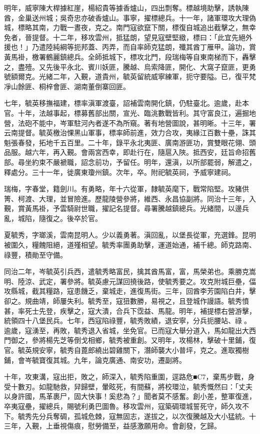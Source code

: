 \begin{pinyinscope}
明年，威寧陳大桿據紅崖，楊紹貴等據香爐山，四出剽奪。標越境助擊，誘執陳酋，金巢送州城；吳奇忠亦破香爐山。事寧，擢標總兵。十一年，諸軍環攻大理偽城，標略其南，力戰一晝夜，克之。南門寇欲竄下關，標復自城追出截擊之，無幸免者，晉提督。十二年，移攻雲州，抵猛朗，望見寇壁堅緻，標曰：「此宜先絕外援也！」乃遣陸純綱等扼邦蓋、丙弄，而自率師克猛朗，殲其酋丁雁甲。論功，賞黃馬褂，檄署鶴麗鎮總兵。全師抵城下，標攻北門，段瑞梅等自東南梯而下，轟擊之，盡殪。又先後平永北、賓川妖匪，騰越、烏索降匪，開化、大窩子竄匪，更勇號額爾克。光緒二年，入覲，道貴州，毓英留統威寧練軍，扼守要隘。已，復平梵凈山餘匪、桐梓會匪、湖南董倒寨回匪。

七年，毓英移撫福建，標率滇軍渡臺，詔補雲南開化鎮，仍駐臺北。逾歲，赴本官。十年，法越事起，標募舊部出關，宣光、臨洮數戰皆利。其守富良江，遍掘地營，法砲不能中，岑軍駐河內者遂不為所窺。著有地營圖說，甚明晰。十三年，署云南提督。毓英檄治惈黑山軍事，標率師前進，效力合攻，夷緣江百數十壘，誅其魁張春發，拓地千五百里。二十年，錄平永北夷匪、廣南游匪功，賞雙眼花翎、頭品服。越六年，再入覲。會兩宮西幸，即赴行在，隨扈入陜。抵西安，廷旨命招舊部。尋坐約束不嚴褫職，詔念前功，予留任。明年，還滇，以所部罷弱，解遣之，釋處分。三十一年，徙廣東瓊州鎮。次年，卒。附祀毓英祠，予威寧建祠。

瑞梅，字春堂，籍劍川。有勇略，年十六從軍，隸毓英麾下，戰常陷堅。攻豬供箐、柯渡、大理，並冒險進。歷龍陵營參將，維西、永昌協副將。同治十三年，入覲，賞黃馬褂，予雲騎尉世職，擢記名提督。尋署騰越鎮總兵。光緒間，以邊兵亂，城陷，隨復之。後卒於官。

夏毓秀，字瑯溪，雲南昆明人。少以義勇著。滇回亂，以堡長從軍，充選鋒。昆明被圍久，糧餽阻絕，道殣相望。毓秀率團勇助擊，運道始通，補千總。師克路南、祿豐，積勛至守備。

同治二年，岑毓英引兵西，遣毓秀略富民，擒其酋馬富，富，馬榮弟也。乘勝克嵩明、陸涼、武定，署參將。毓英慮元謀回撓後路，使毓秀要之。攻克附城巨壘，偪攻縣城，截其糧路，寇患饑乏，棄城走，進復馬街。三年，回酋李芳園陷白井，擊卻之。規曲靖，師屢失利。毓秀至，寇狃數勝，易視之，且登城作謾語。毓秀憤甚，率死士先登，疾擊之，寇大潰，合兵下霑益、馬龍。明年，補提標右營游擊，統領四十八堡民兵。七年，西寇陷祿豐，毓秀敗績，退安寧，分兵扼腰站、祿。逾歲，寇湧至，再敗，毓秀退入省城，坐免官。已而寇大舉分道入，馬如龍出大西門御之，參將楊先芝等倒戈相鄉，毓秀被重創。又明年，攻楊林，擊破十里鋪，復官。毓英規安寧，毓秀自蓖郎繞出碧雞關下，潛師襲大小普坪，克之。進取獨樹鋪，會岑毓寶復其城。九年，論克廣通、南安功，遷副將。

十年，攻東溝，寇出拒，敗之，師深入，毓秀陷重圍，逕路危■C7，棄馬步戰，身受十數刃。如龍馳救，舁歸壁，暈眩死，有間蘇，將校環泣，毓秀慨然曰：「丈夫以身許國，馬革裹尸，固大快事！奚悲為？」聞者莫不感奮。創小差，整軍復進，卒夷寇壘，擢總兵，賜號利勇巴圖魯。移攻雲州，寇築碉環城誓死守，師久攻不下。毓秀先分兵奪碉，孤城危棘，寇無固志，遂拔之，以次復騰越及大小猛統。十三年，入覲，上垂視傷痕，慰勞備至，益感激願用命。會創發，乞歸。


\end{pinyinscope}
